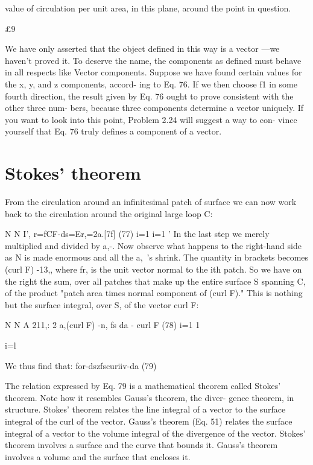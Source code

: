 value of circulation per unit area, in this plane, around the point in
question.

   

£9

 

We have only asserted that the object defined in this way is a vector
---we haven't proved it. To deserve the name, the components as
defined must behave in all respects like Vector components. Suppose
we have found certain values for the x, y, and z components, accord-
ing to Eq. 76. If we then choose f1 in some fourth direction, the result
given by Eq. 76 ought to prove consistent with the other three num-
bers, because three components determine a vector uniquely. If you
want to look into this point, Problem 2.24 will suggest a way to con-
vince yourself that Eq. 76 truly defines a component of a vector.

\section{Stokes' theorem}

From the circulation around an infinitesimal patch of surface we
can now work back to the circulation around the original large
loop C:

N N I',
r=fCF-ds=Er,=2a.[7f] (77)
i=1 i=1 '
In the last step we merely multiplied and divided by a,-. Now observe
what happens to the right-hand side as N is made enormous and all
the a,~'s shrink. The quantity in brackets becomes (curl F) -13,,
where fr, is the unit vector normal to the ith patch. So we have on
the right the sum, over all patches that make up the entire surface S
spanning C, of the product "patch area times normal component of
(curl F)." This is nothing but the surface integral, over S, of the
vector curl F:

N  N A
211,: 2 a,(curl F) -n, \rightarrow fs da - curl F (78)
i=1 1

i=l

We thus find that:
for-dszfscuriiv-da (79)

The relation expressed by Eq. 79 is a mathematical theorem called
Stokes' theorem. Note how it resembles Gauss's theorem, the diver-
gence theorem, in structure. Stokes' theorem relates the line integral
of a vector to the surface integral of the curl of the vector. Gauss's
theorem (Eq. 51) relates the surface integral of a vector to the volume
integral of the divergence of the vector. Stokes' theorem involves
a surface and the curve that bounds it. Gauss's theorem involves a
volume and the surface that encloses it.

